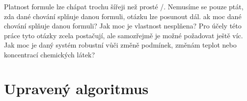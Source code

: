 Platnost formule lze chápat trochu šířeji než prosté /.
Nemusíme se pouze ptát, zda dané chování splňuje danou formuli, otázku lze posunout dál.
ak moc dané chování splňuje danou formuli? Jak moc je vlastnost nesplňena? Pro účely
této práce tyto otázky zcela postačují, ale samozřejmě je možné požadovat ještě víc.
Jak moc je daný systém robustní vůči změně podmínek, změnám teplot nebo koncentrací
chemických látek?





\section{Upravený algoritmus}\label{section:algorithm:updated}
